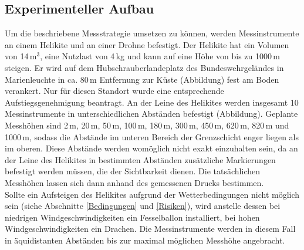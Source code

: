 \documentclass[a4paper,11pt,DIV=calc,tablecaptionabove,headinclude,twoside]{article}
\begin{document}
\subsection{Experimenteller Aufbau}
\label{Aufbau}
%
%
%

Um die beschriebene Messstrategie umsetzen zu können, werden Messinstrumente an einem Helikite und an einer Drohne befestigt. 
Der Helikite hat ein Volumen von 14\,$\text{m}^{3}$, eine Nutzlast von 4\,kg und kann auf eine Höhe von bis zu 1000\,m steigen. Er wird auf dem Hubschrauberlandeplatz des Bundeswehrgeländes in Marienleuchte in ca. 80\,m Entfernung zur Küste (Abbildung) fest am Boden verankert. Nur für diesen Standort wurde eine entsprechende Aufstiegsgenehmigung beantragt. An der Leine des Helikites werden insgesamt 10 Messinstrumente in unterschiedlichen Abständen befestigt (Abbildung). Geplante Messhöhen sind 2\,m, 20\,m, 50\,m, 100\,m, 180\,m, 300\,m, 450\,m, 620\,m, 820\,m und 1000\,m, sodass die Abstände im unteren Bereich der Grenzschicht enger liegen als im oberen. Diese Abstände werden womöglich nicht exakt einzuhalten sein, da an der Leine des Helikites in bestimmten Abständen zusätzliche Markierungen befestigt werden müssen, die der Sichtbarkeit dienen. Die tatsächlichen Messhöhen lassen sich dann anhand des gemessenen Drucks bestimmen. \\

Sollte ein Aufsteigen des Helikites aufgrund der Wetterbedingungen nicht möglich sein (siehe Abschnitte \ref{Bedingungen} und \ref{Risiken}), wird anstelle dessen bei niedrigen Windgeschwindigkeiten ein Fesselballon installiert, bei hohen Windgeschwindigkeiten ein Drachen. Die Messinstrumente werden in diesem Fall in äquidistanten Abständen bis zur maximal möglichen Messhöhe angebracht. \\
  
\end{document}
